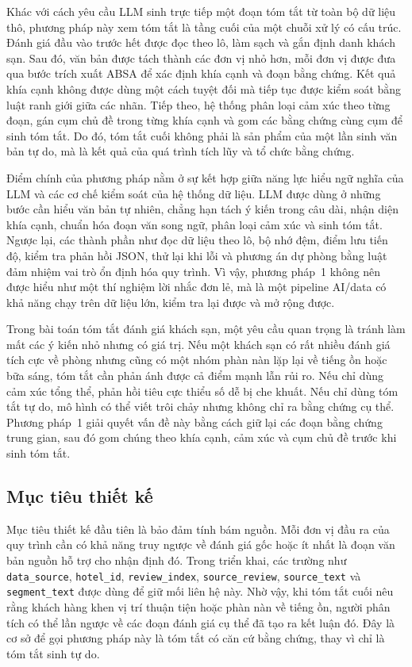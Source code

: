 \documentclass[12pt,a4paper]{report}
\begin{document}
Khác với cách yêu cầu LLM sinh trực tiếp một đoạn tóm tắt từ toàn bộ dữ liệu thô, phương pháp này xem tóm tắt là tầng cuối của một chuỗi xử lý có cấu trúc. Đánh giá đầu vào trước hết được đọc theo lô, làm sạch và gắn định danh khách sạn. Sau đó, văn bản được tách thành các đơn vị nhỏ hơn, mỗi đơn vị được đưa qua bước trích xuất ABSA để xác định khía cạnh và đoạn bằng chứng. Kết quả khía cạnh không được dùng một cách tuyệt đối mà tiếp tục được kiểm soát bằng luật ranh giới giữa các nhãn. Tiếp theo, hệ thống phân loại cảm xúc theo từng đoạn, gán cụm chủ đề trong từng khía cạnh và gom các bằng chứng cùng cụm để sinh tóm tắt. Do đó, tóm tắt cuối không phải là sản phẩm của một lần sinh văn bản tự do, mà là kết quả của quá trình tích lũy và tổ chức bằng chứng.

Điểm chính của phương pháp nằm ở sự kết hợp giữa năng lực hiểu ngữ nghĩa của LLM và các cơ chế kiểm soát của hệ thống dữ liệu. LLM được dùng ở những bước cần hiểu văn bản tự nhiên, chẳng hạn tách ý kiến trong câu dài, nhận diện khía cạnh, chuẩn hóa đoạn văn song ngữ, phân loại cảm xúc và sinh tóm tắt. Ngược lại, các thành phần như đọc dữ liệu theo lô, bộ nhớ đệm, điểm lưu tiến độ, kiểm tra phản hồi JSON, thử lại khi lỗi và phương án dự phòng bằng luật đảm nhiệm vai trò ổn định hóa quy trình. Vì vậy, phương pháp~1 không nên được hiểu như một thí nghiệm lời nhắc đơn lẻ, mà là một pipeline AI/data có khả năng chạy trên dữ liệu lớn, kiểm tra lại được và mở rộng được.

Trong bài toán tóm tắt đánh giá khách sạn, một yêu cầu quan trọng là tránh làm mất các ý kiến nhỏ nhưng có giá trị. Nếu một khách sạn có rất nhiều đánh giá tích cực về phòng nhưng cũng có một nhóm phàn nàn lặp lại về tiếng ồn hoặc bữa sáng, tóm tắt cần phản ánh được cả điểm mạnh lẫn rủi ro. Nếu chỉ dùng cảm xúc tổng thể, phản hồi tiêu cực thiểu số dễ bị che khuất. Nếu chỉ dùng tóm tắt tự do, mô hình có thể viết trôi chảy nhưng không chỉ ra bằng chứng cụ thể. Phương pháp~1 giải quyết vấn đề này bằng cách giữ lại các đoạn bằng chứng trung gian, sau đó gom chúng theo khía cạnh, cảm xúc và cụm chủ đề trước khi sinh tóm tắt.

\subsection{Mục tiêu thiết kế}

Mục tiêu thiết kế đầu tiên là bảo đảm tính bám nguồn. Mỗi đơn vị đầu ra của quy trình cần có khả năng truy ngược về đánh giá gốc hoặc ít nhất là đoạn văn bản nguồn hỗ trợ cho nhận định đó. Trong triển khai, các trường như \texttt{data\_source}, \texttt{hotel\_id}, \texttt{review\_index}, \texttt{source\_review}, \texttt{source\_text} và \texttt{segment\_text} được dùng để giữ mối liên hệ này. Nhờ vậy, khi tóm tắt cuối nêu rằng khách hàng khen vị trí thuận tiện hoặc phàn nàn về tiếng ồn, người phân tích có thể lần ngược về các đoạn đánh giá cụ thể đã tạo ra kết luận đó. Đây là cơ sở để gọi phương pháp này là tóm tắt có căn cứ bằng chứng, thay vì chỉ là tóm tắt sinh tự do.
\end{document}
